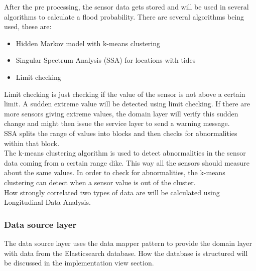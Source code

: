 %
After the pre processing, the sensor data gets stored and will be used in several algorithms to calculate a flood probability.
There are several algorithms being used, these are:
\begin{itemize}
	\item Hidden Markov model with k-means clustering
	\item Singular Spectrum Analysis (SSA) for locations with tides
	\item Limit checking
\end{itemize}

Limit checking is just checking if the value of the sensor is not above a certain limit. A sudden extreme value will be detected using limit checking. If there are more sensors giving extreme values, the domain layer will verify this sudden change and might then issue the service layer to send a warning message.\\
SSA splits the range of values into blocks and then checks for abnormalities within that block.\\
The k-means clustering algorithm is used to detect abnormalities in the sensor data coming from a certain range dike. This way all the sensors should measure about the same values. In order to check for abnormalities, the k-means clustering can detect when a sensor value is out of the cluster.\\

How strongly correlated two types of data are will be calculated using Longitudinal Data Analysis.

\subsubsection*{Data source layer}
The data source layer uses the data mapper pattern to provide the domain layer with data from the Elasticsearch database. How the database is structured will be discussed in the implementation view section.






